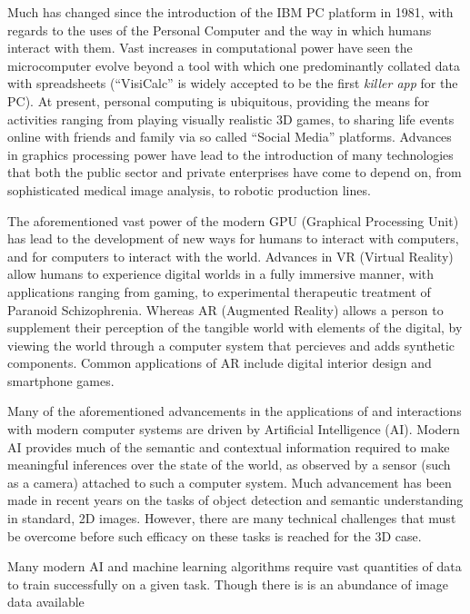 Much has changed since the introduction of the IBM PC platform in 1981, with regards to the 
uses of the Personal Computer and the way in which humans interact with them. Vast increases 
in computational power have seen the microcomputer evolve beyond a tool with which one predominantly 
collated data with spreadsheets (``VisiCalc'' is widely accepted to be the first \textit{killer app}
for the PC). At present, personal computing is ubiquitous, providing the means for activities ranging 
from playing visually realistic 3D games, to sharing life events online with friends and family via 
so called ``Social Media'' platforms. Advances in graphics processing power have lead to the introduction 
of many technologies that both the public sector and private enterprises have come to depend on, from 
sophisticated medical image analysis, to robotic production lines.

The aforementioned vast power of the modern GPU (Graphical Processing Unit) has lead to the development 
of new ways for humans to interact with computers, and for computers to interact with the world. Advances 
in VR (Virtual Reality) allow humans to experience digital worlds in a fully immersive manner, with 
applications ranging from gaming, to experimental therapeutic treatment of Paranoid Schizophrenia. 
Whereas AR (Augmented Reality) allows a person to supplement their perception of the tangible world with 
elements of the digital, by viewing the world through a computer system that percieves and adds synthetic 
components. Common applications of AR include digital interior design and smartphone games.

Many of the aforementioned advancements in the applications of and interactions with modern computer 
systems are driven by Artificial Intelligence (AI). Modern AI provides much of the semantic and contextual 
information required to make meaningful inferences over the state of the world, as observed by a sensor 
(such as a camera) attached to such a computer system. Much advancement has been made in recent years on 
the tasks of object detection and semantic understanding in standard, 2D images. However, there are many 
technical challenges that must be overcome before such efficacy on these tasks is reached for the 3D 
case.

Many modern AI and machine learning algorithms require vast quantities of data to train successfully 
on a given task. Though there is is an abundance of image data available 

